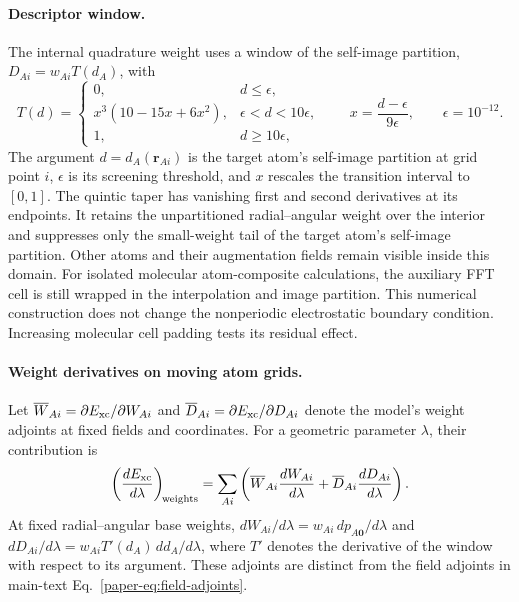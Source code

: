 \documentclass[10pt,a4paper]{article}
\begin{document}
\paragraph{Descriptor window.}
The internal quadrature weight uses a window of the self-image partition, $D_{Ai}=w_{Ai}T(d_A)$, with
\begin{equation}
 T(d)=\begin{cases}
 0,&d\leq\epsilon,\\
 x^3(10-15x+6x^2),&\epsilon<d<10\epsilon,\\
 1,&d\geq10\epsilon,
 \end{cases}
 \qquad x=\frac{d-\epsilon}{9\epsilon},\qquad \epsilon=10^{-12}.
 \label{eq:descriptor-window}
\end{equation}
The argument $d=d_A(\mathbf r_{Ai})$ is the target atom's self-image partition at grid point $i$, $\epsilon$ is its screening threshold, and $x$ rescales the transition interval to $[0,1]$.
The quintic taper has vanishing first and second derivatives at its endpoints. It retains the unpartitioned radial--angular weight over the interior and suppresses only the small-weight tail of the target atom's self-image partition. Other atoms and their augmentation fields remain visible inside this domain. For isolated molecular atom-composite calculations, the auxiliary FFT cell is still wrapped in the interpolation and image partition. This numerical construction does not change the nonperiodic electrostatic boundary condition. Increasing molecular cell padding tests its residual effect.

\paragraph{Weight derivatives on moving atom grids.}
Let $\overline W_{Ai}=\partial E_{\rm xc}/\partial W_{Ai}$ and $\overline D_{Ai}=\partial E_{\rm xc}/\partial D_{Ai}$ denote the model's weight adjoints at fixed fields and coordinates. For a geometric parameter $\lambda$, their contribution is
\begin{equation}
 \left(\frac{dE_{\rm xc}}{d\lambda}\right)_{\!\rm weights}
 =\sum_{Ai}\left(\overline W_{Ai}\frac{dW_{Ai}}{d\lambda}
                   +\overline D_{Ai}\frac{dD_{Ai}}{d\lambda}\right).
 \label{eq:weight-chain-rule}
\end{equation}
At fixed radial--angular base weights, $dW_{Ai}/d\lambda=w_{Ai}\,dp_{A\mathbf0}/d\lambda$ and $dD_{Ai}/d\lambda=w_{Ai}T'(d_A)\,dd_A/d\lambda$, where $T'$ denotes the derivative of the window with respect to its argument. These adjoints are distinct from the field adjoints in main-text Eq.~\eqref{paper-eq:field-adjoints}.
\end{document}
